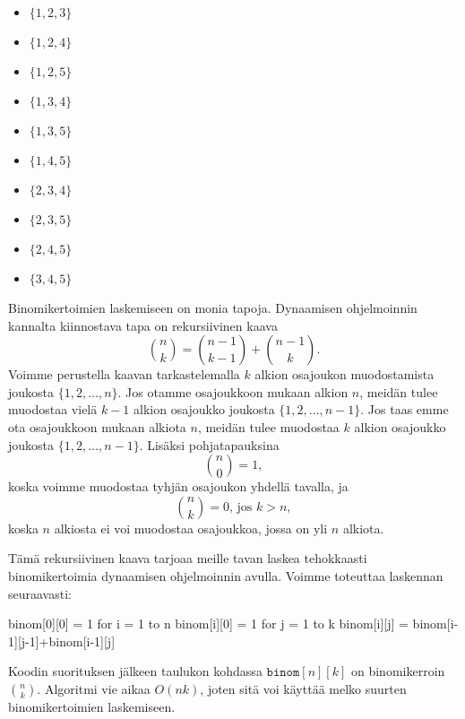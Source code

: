 \begin{multicols}{3}
\begin{itemize}
\item $\{1,2,3\}$
\item $\{1,2,4\}$
\item $\{1,2,5\}$
\item $\{1,3,4\}$
\item $\{1,3,5\}$
\item $\{1,4,5\}$
\item $\{2,3,4\}$
\item $\{2,3,5\}$
\item $\{2,4,5\}$
\item $\{3,4,5\}$
\end{itemize}
\end{multicols}

Binomikertoimien laskemiseen on monia tapoja.
Dynaamisen ohjelmoinnin kannalta kiinnostava tapa on rekursiivinen kaava
\[\binom{n}{k} = \binom{n-1}{k-1} + \binom{n-1}{k}.\]
Voimme perustella kaavan tarkastelemalla
$k$ alkion osajoukon muodostamista joukosta $\{1,2,\dots,n\}$.
Jos otamme osajoukkoon mukaan alkion $n$, meidän tulee muodostaa
vielä $k-1$ alkion osajoukko joukosta $\{1,2,\dots,n-1\}$.
Jos taas emme ota osajoukkoon mukaan alkiota $n$, meidän tulee muodostaa
$k$ alkion osajoukko joukosta $\{1,2,\dots,n-1\}$.
Lisäksi pohjatapauksina
\[ \binom{n}{0} = 1,\]
koska voimme muodostaa tyhjän osajoukon yhdellä tavalla, ja
\[ \binom{n}{k} = 0,\,\textrm{jos $k>n$},\]
koska $n$ alkiosta ei voi muodostaa osajoukkoa, jossa on yli $n$ alkiota.

Tämä rekursiivinen kaava tarjoaa meille tavan laskea tehokkaasti
binomikertoimia dynaamisen ohjelmoinnin avulla.
Voimme toteuttaa laskennan seuraavasti:

\begin{code}
binom[0][0] = 1
for i = 1 to n
    binom[i][0] = 1
    for j = 1 to k
        binom[i][j] = binom[i-1][j-1]+binom[i-1][j]
\end{code}

Koodin suorituksen jälkeen taulukon kohdassa
$\texttt{binom}[n][k]$ on binomikerroin $\binom{n}{k}$.
Algoritmi vie aikaa $O(nk)$, joten sitä voi käyttää
melko suurten binomikertoimien laskemiseen.
